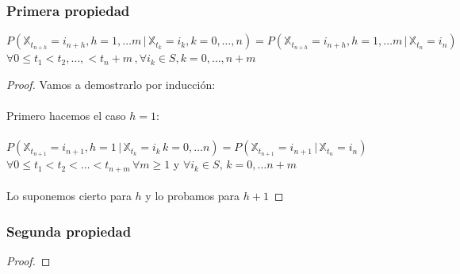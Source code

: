 \documentclass[12pt,a4paper]{article}
\begin{document}
\subsubsection{Primera propiedad}
$P(\mathbb{X}_{t_{n+h}}=i_{n+h}, h=1,\ldots m \, | \, \mathbb{X}_{t_k}=i_k, k=0,\ldots ,n)=P(\mathbb{X}_{t_{n+h}}=i_{n+h}, h=1,\ldots m\, |\, \mathbb{X}_{t_n}=i_n )$
\\
$\forall 0 \leq t_1< t_2, \ldots , < t_n+m\, , \forall i_k\in S, k=0,\ldots , n+m$
\begin{proof}
Vamos a demostrarlo por inducción:
\\\\
Primero hacemos el caso $h=1$:
\\\\
$P(\mathbb{X}_{t_{n+1}}=i_{n+1},h=1 \, |\, \mathbb{X}_{t_k}=i_k\, k=0,\ldots n)=P(\mathbb{X}_{t_{n+1}}=i_{n+1}\, | \,\mathbb{X}_{t_n}=i_n)$
\\
$\forall 0\leq t_1<t_2<\ldots <t_{n+m}\, \forall m\geq 1$ y $\forall i_k \in S, \,k=0,\ldots n+m$
\\\\
Lo suponemos cierto para $h$ y lo probamos para $h+1$

\end{proof}
\subsubsection{Segunda propiedad}
\begin{proof}

\end{proof}
\end{document}
